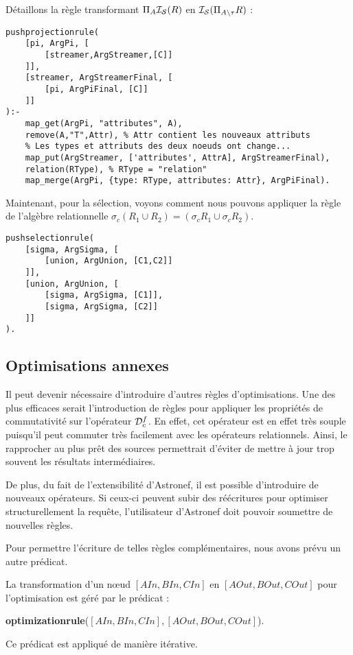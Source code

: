 \begin{example}
	Détaillons la règle transformant $\Pi_A \mathcal{I_S}(R)$ en $\mathcal{I_S}(\Pi_{A\backslash \tau} R)$ :
	\begin{lstlisting}
pushprojectionrule(
    [pi, ArgPi, [
        [streamer,ArgStreamer,[C]]
    ]],
    [streamer, ArgStreamerFinal, [
        [pi, ArgPiFinal, [C]]
    ]]
):- 
    map_get(ArgPi, "attributes", A),
    remove(A,"T",Attr), % Attr contient les nouveaux attributs
	% Les types et attributs des deux noeuds ont change...
    map_put(ArgStreamer, ['attributes', AttrA], ArgStreamerFinal),
    relation(RType), % RType = "relation"
    map_merge(ArgPi, {type: RType, attributes: Attr}, ArgPiFinal).
	\end{lstlisting}
	
	Maintenant, pour la sélection, voyons comment nous pouvons appliquer la règle de l'algèbre relationnelle $\sigma_c (R_1 \cup R_2) = (\sigma_c R_1 \cup \sigma_c R_2)$.
	\begin{lstlisting}
pushselectionrule(
    [sigma, ArgSigma, [
        [union, ArgUnion, [C1,C2]]
    ]],
    [union, ArgUnion, [
        [sigma, ArgSigma, [C1]], 
        [sigma, ArgSigma, [C2]]
    ]]
).
	\end{lstlisting}
\end{example}

\subsection{Optimisations annexes}
Il peut devenir nécessaire d'introduire d'autres règles d'optimisations. Une des plus efficaces serait l'introduction de règles pour appliquer les propriétés de commutativité sur l'opérateur $\mathcal{D}_c^f$. En effet, cet opérateur est en effet très souple puisqu'il peut commuter très facilement avec les opérateurs relationnels. Ainsi, le rapprocher au plus prêt des sources permettrait d'éviter de mettre à jour trop souvent les résultats intermédiaires. 

De plus, du fait de l'extensibilité d'Astronef, il est possible d'introduire de nouveaux opérateurs. Si ceux-ci peuvent subir des réécritures pour optimiser structurellement la requête, l'utilisateur d'Astronef doit pouvoir soumettre de nouvelles règles.

Pour permettre l'écriture de telles règles complémentaires, nous avons prévu un autre prédicat.
\begin{regle}
La transformation d'un nœud $[AIn,BIn,CIn]$ en $[AOut,BOut,COut]$ pour l'optimisation est géré par le prédicat :
\begin{center} \textbf{optimizationrule}($[AIn,BIn,CIn],[AOut,BOut,COut]$).\end{center}
Ce prédicat est appliqué de manière itérative.
\end{regle}

